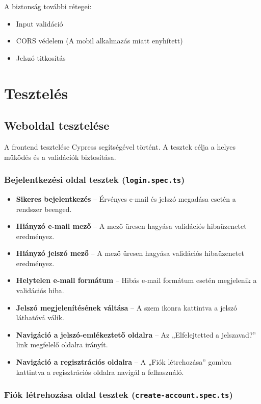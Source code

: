 \documentclass[12pt]{report}
\begin{document}
A biztonság további rétegei:
\begin{itemize}
  \item Input validáció
  \item CORS védelem (A mobil alkalmazás miatt enyhített)
  \item Jelszó titkosítás
\end{itemize}
\chapter{Tesztelés}
\section{Weboldal tesztelése}
A frontend tesztelése Cypress segítségével történt. A tesztek célja a helyes működés és a validációk biztosítása.

\subsection{Bejelentkezési oldal tesztek (\texttt{login.spec.ts})}

\begin{itemize}
  \item \textbf{Sikeres bejelentkezés} – Érvényes e-mail és jelszó megadása esetén a rendszer beenged.
  \item \textbf{Hiányzó e-mail mező} – A mező üresen hagyása validációs hibaüzenetet eredményez.
  \item \textbf{Hiányzó jelszó mező} – A mező üresen hagyása validációs hibaüzenetet eredményez.
  \item \textbf{Helytelen e-mail formátum} – Hibás e-mail formátum esetén megjelenik a validációs hiba.
  \item \textbf{Jelszó megjelenítésének váltása} – A szem ikonra kattintva a jelszó láthatóvá válik.
  \item \textbf{Navigáció a jelszó-emlékeztető oldalra} – Az „Elfelejtetted a jelszavad?” link megfelelő oldalra irányít.
  \item \textbf{Navigáció a regisztrációs oldalra} – A „Fiók létrehozása” gombra kattintva a regisztrációs oldalra navigál a felhasználó.
\end{itemize}

\subsection{Fiók létrehozása oldal tesztek (\texttt{create-account.spec.ts})}
\end{document}
